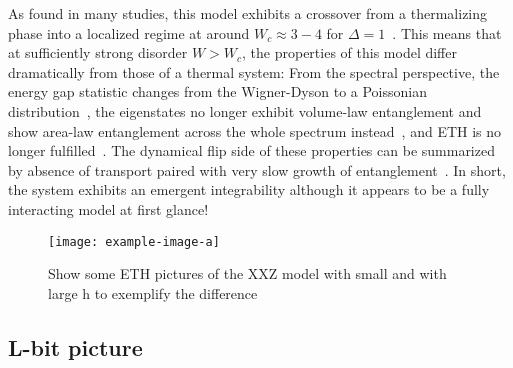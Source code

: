 As found in many studies, this model exhibits a crossover from a thermalizing phase into a localized regime at around $W_c \approx 3-4$ for $\Delta=1$~\cite{oganesyanLocalizationInteractingFermions2007,palManybodyLocalizationPhase2010,berkelbachConductivityDisorderedQuantum2010,delucaErgodicityBreakingModel2013,bauerAreaLawsManybody2013,nanduriEntanglementSpreadingManybody2014,luitzManybodyLocalizationEdge2015,serbynCriterionManybodyLocalizationdelocalization2015,barlevAbsenceDiffusionInteracting2015,devakulEarlyBreakdownAreaLaw2015,luitzExtendedSlowDynamical2016,maceMultifractalScalingsManyBody2019,loganManybodyLocalizationFock2019,chandaManybodyLocalizationTransition2020,tarziaManybodyLocalizationTransition2020,sierantPolynomiallyFilteredExact2020}.
This means that at sufficiently strong disorder $W>W_c$, the properties of this model differ dramatically from those of a thermal system: From the spectral perspective, the energy gap statistic changes from the Wigner-Dyson to a Poissonian distribution~\cite{oganesyanLocalizationInteractingFermions2007}, the eigenstates no longer exhibit volume-law entanglement and show area-law entanglement across the whole spectrum instead~\cite{bauerAreaLawsManybody2013,geraedtsManybodyLocalizationThermalization2016}, and ETH is no longer fulfilled~\cite{kimTestingWhetherAll2014,albaEigenstateThermalizationHypothesis2015,mondainiEigenstateThermalizationTwodimensional2016,mierzejewskiEigenstateThermalizationHypothesis2020}. The dynamical flip side of these properties can be summarized by absence of transport paired with very slow growth of entanglement~\cite{znidaricManyBodyLocalization2008,bardarsonUnboundedGrowthEntanglement2012,nanduriEntanglementSpreadingManybody2014,kiefer-emmanouilidisEvidenceUnboundedGrowth2020,luitzThereSlowParticle2020,huangExtensiveEntropyUnitary2021,chavezUltraslowGrowthNumber2023}.
In short, the system exhibits an emergent integrability although it appears to be a fully interacting model at first glance!

\begin{figure}[htb]
	\centering
	\texttt{[image: example-image-a]}
	\caption{Show some ETH pictures of the XXZ model with small and with large h to exemplify the difference}
\end{figure}

\subsection{L-bit picture}


